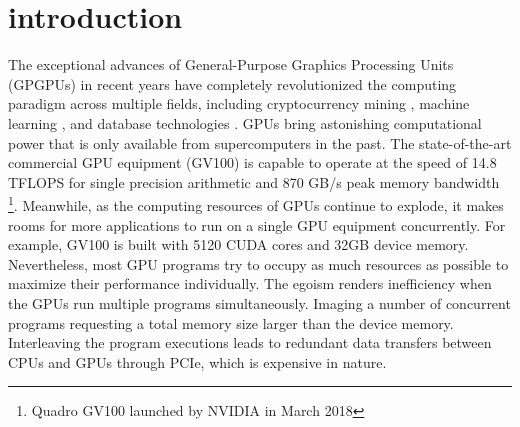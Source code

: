 \section{introduction}
The exceptional advances of General-Purpose Graphics Processing Units (GPGPUs) 
in recent years have completely revolutionized the computing paradigm across multiple fields, including cryptocurrency mining \cite{o2014bitcoin,taylor2013bitcoin}, machine learning \cite{coates2013deep,abadi2016tensorflow}, and database technologies \cite{bakkum2010accelerating,kaldewey2012gpu}.
GPUs bring astonishing computational power that is only available from supercomputers in the past. 
The state-of-the-art commercial GPU equipment (GV100) is capable to operate at the speed of 14.8 TFLOPS for single precision arithmetic and 870 GB/s peak memory bandwidth \footnote{Quadro GV100 launched by NVIDIA in March 2018}. 
Meanwhile, as the computing resources of GPUs continue to explode, it makes rooms for more applications to run on a single GPU equipment concurrently. For example, GV100 is built with 5120 CUDA cores and 32GB device memory. Nevertheless, most GPU programs try to occupy as much resources as possible to maximize their performance individually. 
The egoism renders inefficiency when the GPUs run multiple programs simultaneously. Imaging a number of concurrent programs requesting a total memory size larger than the device memory. Interleaving the program executions leads to redundant data transfers between CPUs and GPUs through PCIe, which is expensive in nature. 

